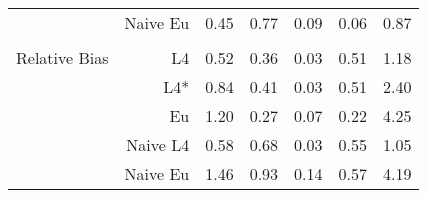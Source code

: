 \documentclass[a4paper,12pt,twoside]{book}
\begin{document}
\begin{table}[H]
\begin{tabular}{crrrrrr}
&Naive Eu &   0.45 & 0.77 & 0.09 & 0.06 & 0.87 \\ 
  
   \\

   \hline
   
{\color{blue} Relative Bias } & L4  &0.52 & 0.36 & 0.03 & 0.51 & 1.18 \\ 
  
&L4*  &0.84 & 0.41 & 0.03 & 0.51 & 2.40 \\ 
  
  
&Eu &  
 1.20 & 0.27 & 0.07 & 0.22 & 4.25 \\ 
  

&Naive L4&  
  0.58 & 0.68 & 0.03 & 0.55 & 1.05 \\  
  
  
&Naive Eu &  
    1.46 & 0.93 & 0.14 & 0.57 & 4.19 \\ 
  
  
\end{tabular}

\end{table}
\end{document}
